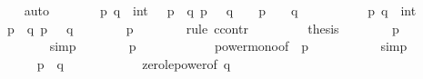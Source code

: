 \begin{isabellebody}
\ \ \ \ \isamarkupfalse%
\ auto\isanewline
\ \ \isamarkupfalse%
\isanewline
\ \ \isamarkupfalse%
\ {\isachardoublequoteopen}{\isasymAnd}\ p\ q\ {\isacharcolon}{\isacharcolon}\ int{\isachardot}\ {\isasymlbrakk}{}{}\ {\isacharequal}\ p{\isacharcircum}{}\ {\isacharplus}\ q{\isacharcircum}{}{\isacharsemicolon}\ p\ {\isasymge}\ {}{\isacharsemicolon}\ q\ {\isasymge}\ {}{\isasymrbrakk}\ {\isasymLongrightarrow}\ p\ {\isacharequal}\ {}\ {\isasymor}\ q\ {\isacharequal}\ {}{\isachardoublequoteclose}\isanewline
\ \ \isamarkupfalse%
{\isacharminus}\isanewline
\ \ \ \ \isamarkupfalse%
\ p\ q\ {\isacharcolon}{\isacharcolon}\ int\isanewline
\ \ \ \ \isamarkupfalse%
\ {\isachardoublequoteopen}{}{}\ {\isacharequal}\ p{\isacharcircum}{}\ {\isacharplus}\ q{\isacharcircum}{}{\isachardoublequoteclose}\ {\isachardoublequoteopen}p\ {\isasymge}\ {}{\isachardoublequoteclose}\ {\isachardoublequoteopen}q\ {\isasymge}\ {}{\isachardoublequoteclose}\isanewline
\ \ \ \ \isamarkupfalse%
\ {\isachardoublequoteopen}p\ {\isasymle}\ {}{\isachardoublequoteclose}\isanewline
\ \ \ \ \isamarkupfalse%
\ {\isacharparenleft}rule\ ccontr{\isacharparenright}\isanewline
\ \ \ \ \ \ \isamarkupfalse%
\ {\isachardoublequoteopen}{\isasymnot}\ {\isacharquery}thesis{\isachardoublequoteclose}\isanewline
\ \ \ \ \ \ \isamarkupfalse%
\ {\isachardoublequoteopen}p\ {\isasymge}\ {}{\isachardoublequoteclose}\isanewline
\ \ \ \ \ \ \ \ \isamarkupfalse%
\ simp\isanewline
\ \ \ \ \ \ \isamarkupfalse%
\ {\isachardoublequoteopen}p{\isacharcircum}{}\ {\isasymge}\ {}{}{\isachardoublequoteclose}\isanewline
\ \ \ \ \ \ \ \ \isamarkupfalse%
\ power{\isacharunderscore}mono{\isacharbrackleft}of\ {}\ p\ {}{\isacharbrackright}\isanewline
\ \ \ \ \ \ \ \ \isamarkupfalse%
\ simp\isanewline
\ \ \ \ \ \ \isamarkupfalse%
\ {\isachardoublequoteopen}p{\isacharcircum}{}\ {\isacharplus}\ q{\isacharcircum}{}\ {\isasymge}\ {}{}{\isachardoublequoteclose}\isanewline
\ \ \ \ \ \ \ \ \isamarkupfalse%
\ zero{\isacharunderscore}le{\isacharunderscore}power{}{\isacharbrackleft}of\ q{\isacharbrackright}\isanewline

\end{isabellebody}
